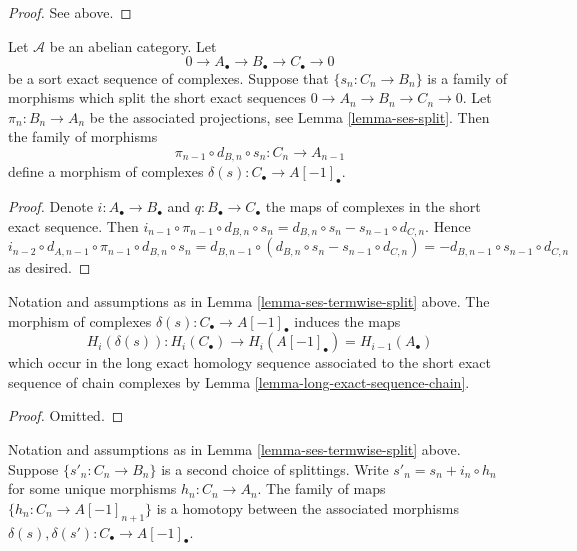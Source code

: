 \begin{proof}
See above.
\end{proof}

\begin{lemma}
\label{lemma-ses-termwise-split}
Let $\mathcal{A}$ be an abelian category.
Let
$$
0 \to A_\bullet \to B_\bullet \to C_\bullet \to 0
$$
be a sort exact sequence of complexes.
Suppose that $\{s_n : C_n \to B_n\}$ is a family
of morphisms which split the short exact sequences
$0 \to A_n \to B_n \to C_n \to 0$. Let
$\pi_n : B_n \to A_n$ be the associated
projections, see Lemma \ref{lemma-ses-split}.
Then the family of morphisms
$$
\pi_{n - 1} \circ d_{B, n} \circ s_n
:
C_n \to A_{n - 1}
$$
define a morphism of complexes $\delta(s) : C_\bullet \to A[-1]_\bullet$.
\end{lemma}

\begin{proof}
Denote $i : A_\bullet \to B_\bullet$ and $q : B_\bullet \to C_\bullet$
the maps of complexes in the short exact sequence. Then
$i_{n - 1} \circ \pi_{n - 1} \circ d_{B, n} \circ s_n =
d_{B, n} \circ s_n - s_{n - 1} \circ d_{C, n}$. Hence
$i_{n - 2} \circ d_{A, n - 1} \circ \pi_{n - 1} \circ d_{B, n} \circ s_n =
d_{B, n - 1} \circ (d_{B, n} \circ s_n - s_{n - 1} \circ d_{C, n}) =
- d_{B, n - 1} \circ s_{n - 1} \circ d_{C, n}$ as desired.
\end{proof}

\begin{lemma}
\label{lemma-ses-termwise-split-long}
Notation and assumptions as in Lemma \ref{lemma-ses-termwise-split} above.
The morphism of complexes $\delta(s) : C_\bullet \to A[-1]_\bullet$
induces the maps
$$
H_i(\delta(s)) :
H_i(C_\bullet) \longrightarrow H_i(A[-1]_\bullet) = H_{i - 1}(A_\bullet)
$$
which occur in the long exact homology sequence associated
to the short exact sequence of chain complexes by
Lemma \ref{lemma-long-exact-sequence-chain}.
\end{lemma}

\begin{proof}
Omitted.
\end{proof}

\begin{lemma}
\label{lemma-ses-termwise-split-homotopy}
Notation and assumptions as in Lemma \ref{lemma-ses-termwise-split} above.
Suppose $\{s'_n : C_n \to B_n\}$ is a second choice of splittings.
Write $s'_n = s_n + i_n \circ h_n$ for some unique
morphisms $h_n : C_n \to A_n$. The family of maps
$\{h_n : C_n \to A[-1]_{n + 1}\}$ is a homotopy between
the associated morphisms
$\delta(s), \delta(s') : C_\bullet \to A[-1]_\bullet$.
\end{lemma}


